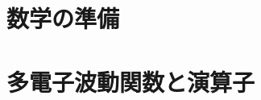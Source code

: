 \documentclass[10pt,dvipdfmx,report]{jsbook}
\begin{document}
\pagestyle{empty}

%
%
\chapter{数学の準備}


\chapter{多電子波動関数と演算子}

\end{document}
